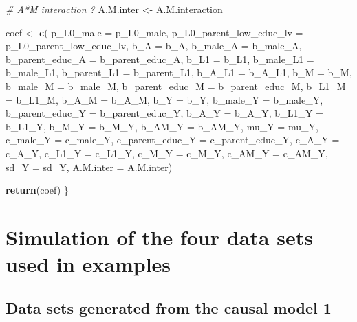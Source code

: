 \documentclass[
]{book}
\newenvironment{Shaded}{\begin{snugshade}}{\end{snugshade}}
\newcommand{\AttributeTok}[1]{\textcolor[rgb]{0.13,0.29,0.53}{#1}}
\newcommand{\CommentTok}[1]{\textcolor[rgb]{0.56,0.35,0.01}{\textit{#1}}}
\newcommand{\FunctionTok}[1]{\textcolor[rgb]{0.13,0.29,0.53}{\textbf{#1}}}
\newcommand{\NormalTok}[1]{#1}
\newcommand{\OtherTok}[1]{\textcolor[rgb]{0.56,0.35,0.01}{#1}}
\begin{document}
\begin{Shaded}
\begin{Highlighting}[]
\CommentTok{\# A*M interaction ?}
\NormalTok{A.M.inter }\OtherTok{\textless{}{-}}\NormalTok{ A.M.interaction}

\NormalTok{coef }\OtherTok{\textless{}{-}} \FunctionTok{c}\NormalTok{( }\AttributeTok{p\_L0\_male =}\NormalTok{ p\_L0\_male, }\AttributeTok{p\_L0\_parent\_low\_educ\_lv =}\NormalTok{ p\_L0\_parent\_low\_educ\_lv, }
           \AttributeTok{b\_A =}\NormalTok{ b\_A, }\AttributeTok{b\_male\_A =}\NormalTok{ b\_male\_A, }\AttributeTok{b\_parent\_educ\_A =}\NormalTok{ b\_parent\_educ\_A, }
           \AttributeTok{b\_L1 =}\NormalTok{ b\_L1, }\AttributeTok{b\_male\_L1 =}\NormalTok{ b\_male\_L1, }\AttributeTok{b\_parent\_L1 =}\NormalTok{ b\_parent\_L1, }
            \AttributeTok{b\_A\_L1 =}\NormalTok{ b\_A\_L1,}
           \AttributeTok{b\_M =}\NormalTok{ b\_M, }\AttributeTok{b\_male\_M =}\NormalTok{ b\_male\_M, }\AttributeTok{b\_parent\_educ\_M =}\NormalTok{ b\_parent\_educ\_M, }
            \AttributeTok{b\_L1\_M =}\NormalTok{ b\_L1\_M, }\AttributeTok{b\_A\_M =}\NormalTok{ b\_A\_M,}
           \AttributeTok{b\_Y =}\NormalTok{ b\_Y, }\AttributeTok{b\_male\_Y =}\NormalTok{ b\_male\_Y, }\AttributeTok{b\_parent\_educ\_Y =}\NormalTok{ b\_parent\_educ\_Y, }
            \AttributeTok{b\_A\_Y =}\NormalTok{ b\_A\_Y, }\AttributeTok{b\_L1\_Y =}\NormalTok{ b\_L1\_Y, }\AttributeTok{b\_M\_Y =}\NormalTok{ b\_M\_Y, }\AttributeTok{b\_AM\_Y =}\NormalTok{ b\_AM\_Y,}
           \AttributeTok{mu\_Y =}\NormalTok{ mu\_Y, }\AttributeTok{c\_male\_Y =}\NormalTok{ c\_male\_Y, }\AttributeTok{c\_parent\_educ\_Y =}\NormalTok{ c\_parent\_educ\_Y, }
            \AttributeTok{c\_A\_Y =}\NormalTok{ c\_A\_Y, }\AttributeTok{c\_L1\_Y =}\NormalTok{ c\_L1\_Y, }\AttributeTok{c\_M\_Y =}\NormalTok{ c\_M\_Y, }\AttributeTok{c\_AM\_Y =}\NormalTok{ c\_AM\_Y, }
              \AttributeTok{sd\_Y =}\NormalTok{ sd\_Y, }\AttributeTok{A.M.inter =}\NormalTok{ A.M.inter)}
  
  \FunctionTok{return}\NormalTok{(coef)}
\NormalTok{\}}
\end{Highlighting}
\end{Shaded}

\hypertarget{simulation-of-the-four-data-sets-used-in-examples}{%
\section{Simulation of the four data sets used in examples}\label{simulation-of-the-four-data-sets-used-in-examples}}

\hypertarget{data-sets-generated-from-the-causal-model-1}{%
\subsection{Data sets generated from the causal model 1}\label{data-sets-generated-from-the-causal-model-1}}
\end{document}
